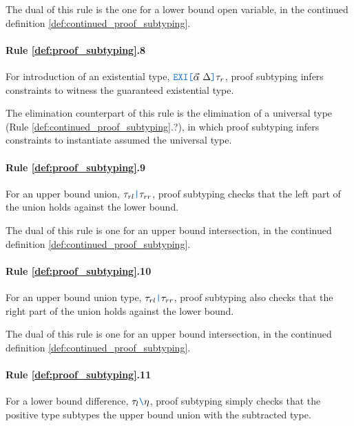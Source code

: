 \documentclass[acmsmall]{acmart}
\theoremstyle{definition}
\begin{document}
The dual of this rule is the one for a lower bound open variable, 
in the continued definition \ref{def:continued_proof_subtyping}.

\paragraph{Rule \ref{def:proof_subtyping}.8}
For introduction of an existential type, $\obj{EXI[}\vec{\alpha}\ \Delta\obj{]}\tau_r$, proof subtyping
infers constraints to witness the guaranteed existential type. 




The elimination counterpart of this rule is the elimination of a universal type (Rule \ref{def:continued_proof_subtyping}.?), 
in which proof subtyping infers constraints to instantiate assumed the universal type.

\paragraph{Rule \ref{def:proof_subtyping}.9}
For an upper bound union, $\tau_{rl}\obj{|}\tau_{rr}$, 
proof subtyping checks that the left part of the union holds against
the lower bound. 

The dual of this rule is one for an upper bound intersection, 
in the continued definition \ref{def:continued_proof_subtyping}.

\paragraph{Rule \ref{def:proof_subtyping}.10}
For an upper bound union type, $\tau_{rl}\obj{|}\tau_{rr}$, 
proof subtyping also checks that the right part of the union holds against
the lower bound. 

The dual of this rule is one for an upper bound intersection, 
in the continued definition \ref{def:continued_proof_subtyping}.

\paragraph{Rule \ref{def:proof_subtyping}.11}
For a lower bound difference, $\tau_l\obj{\textbackslash}\eta$, proof subtyping
simply checks that the positive type subtypes
the upper bound union with the subtracted type. 
\end{document}
